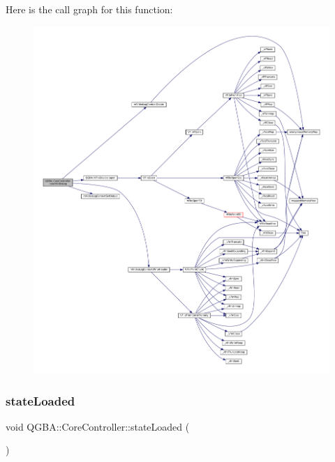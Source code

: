 Here is the call graph for this function\+:
\nopagebreak
\begin{figure}[H]
\begin{center}
\leavevmode
\includegraphics[width=350pt]{class_q_g_b_a_1_1_core_controller_a204fb37311e61673604ab202b4ff06b5_cgraph}
\end{center}
\end{figure}
\mbox{\label{class_q_g_b_a_1_1_core_controller_a560e2751dafab257f447f5560257ec22}} 
\subsubsection{\texorpdfstring{state\+Loaded}{stateLoaded}}
{\footnotesize\ttfamily void Q\+G\+B\+A\+::\+Core\+Controller\+::state\+Loaded (\begin{DoxyParamCaption}{ }\end{DoxyParamCaption})\hspace{0.3cm}{\ttfamily [signal]}}

